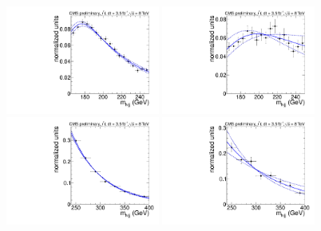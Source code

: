 \begin{figure}[!t]
  \centering
    \includegraphics[width=0.45\textwidth]{plots/2012_WJetsShape/H200_Mlvjj_Muon_2jets_WpJShape.pdf}
    \includegraphics[width=0.45\textwidth]{plots/2012_WJetsShape/H200_Mlvjj_Muon_3jets_WpJShape.pdf}
    \includegraphics[width=0.45\textwidth]{plots/2012_WJetsShape/H300_Mlvjj_Muon_2jets_WpJShape.pdf}
    \includegraphics[width=0.45\textwidth]{plots/2012_WJetsShape/H300_Mlvjj_Muon_3jets_WpJShape.pdf}

\end{figure}
